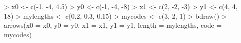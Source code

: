 \begin{Schunk}
\begin{Sinput}
> x0 <- c(-1, -4, 4.5)
> y0 <- c(-1, -4, -8)
> x1 <- c(2, -2, -3)
> y1 <- c(4, 4, 18)
> mylengths <- c(0.2, 0.3, 0.15)
> mycodes <- c(3, 2, 1)
> bdraw()
> arrows(x0 = x0, y0 = y0, x1 = x1, y1 = y1, length = mylengths, code = mycodes)
\end{Sinput}
\end{Schunk}
